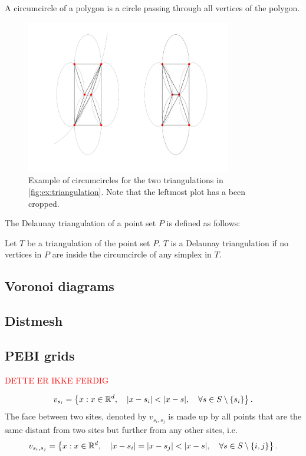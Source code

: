 \begin{definition}[Circumcircle]
A circumcircle of a polygon is a circle passing through all vertices of the polygon.
\end{definition}
\begin{figure}[ht]
    \centering
\includegraphics[width=0.8\textwidth]{report/Images/Theory/circumcircle.png}
    \caption[Example of circumcircles]{Example of circumcircles for the two triangulations in \autoref{fig:ex:triangulation}. Note that the leftmost plot has a been cropped.}
    \label{fig:ex:circumcircles}
\end{figure}

The Delaunay triangulation of a point set $P$ is defined as follows:
\begin{definition}
Let $T$ be a triangulation of the point set $P$. $T$ is a Delaunay triangulation if no vertices in $P$ are inside the circumcircle of any simplex in $T$.
\end{definition}

\subsection{Voronoi diagrams}


\subsection{Distmesh}

\subsection{PEBI grids}
\textcolor{red}{DETTE ER IKKE FERDIG}

\begin{equation}
    v_{s_i} = \left\{ x : x \in \mathbb{R}^d,\quad \lvert x - s_i\rvert < \lvert x - s\rvert,\quad \forall s \in S \setminus \{s_i\} \right\}.
\end{equation}
The face between two sites, denoted by $v_{s_i, s_j}$ is made up by all points that are the same distant from two sites but further from any other sites, i.e.
\begin{equation}
    v_{s_i, s_j} = \left\{ x : x \in \mathbb{R}^d,\quad \lvert x - s_i\rvert = \lvert x - s_j\rvert < \lvert x - s\rvert,\quad \forall s \in S \setminus \{i, j\} \right\}.
\end{equation}

